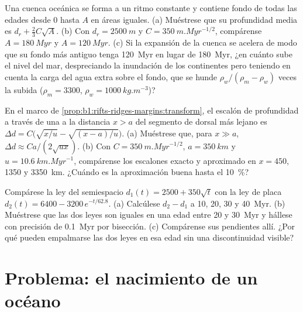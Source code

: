 \begin{exercise}[$\star\star\star$]\label{exo:b1:rifts-ridges-margins:10}
Una cuenca oceánica se forma a un ritmo constante y contiene fondo de todas las edades desde 0 hasta $A$ en áreas iguales. (a) Muéstrese
que su profundidad media es $d_r +
\frac23C\sqrt A$. (b) Con $d_r = \qty{2500}{m}$ y
$C = \qty{350}{m.Myr^{-1/2}}$, compárense $A = \qty{180}{Myr}$ y
$A = \qty{120}{Myr}$. (c) Si la expansión de la cuenca se acelera de modo que su fondo más antiguo tenga \qty{120}{Myr} en lugar de
\qty{180}{Myr}, ¿en cuánto sube el nivel del mar, despreciando la inundación de los continentes pero teniendo en cuenta la carga del agua
extra sobre el fondo, que se hunde $\rho_w/(\rho_m - \rho_w)$ veces la subida ($\rho_m = 3300$, $\rho_w = \qty{1000}{kg.m^{-3}}$)?
\end{exercise}

\begin{exercise}[$\star\star\star$]\label{exo:b1:rifts-ridges-margins:11}
En el marco de \cref{prop:b1:rifts-ridges-margins:transform}, el escalón de profundidad a través de una  a la distancia $x > a$
del segmento de dorsal más lejano es $\Delta d = C\bigl(\sqrt{x/u} - \sqrt{(x - a)/u}\bigr)$. (a) Muéstrese que, para
$x \gg a$, $\Delta d \approx Ca/(2\sqrt{ux})$. (b) Con
$C = \qty{350}{m.Myr^{-1/2}}$, $a = \qty{350}{km}$ y
$u = \qty{10.6}{km.Myr^{-1}}$, compárense los escalones exacto y aproximado en
$x = 450$, 1350 y \qty{3350}{km}. ¿Cuándo es la aproximación buena hasta el
\qty{10}{\percent}?
\end{exercise}

\begin{exercise}[$\star\star\star$]\label{exo:b1:rifts-ridges-margins:12}
Compárese la ley del semiespacio $d_1(t) = 2500 + 350\sqrt t$ con la ley de placa $d_2(t) = 6400 - 3200\,e^{-t/62.8}$. (a) Calcúlese $d_2 - d_1$
a 10, 20, 30 y \qty{40}{Myr}. (b) Muéstrese que las dos leyes son iguales en una edad entre 20 y \qty{30}{Myr} y hállese con precisión de
\qty{0.1}{Myr} por bisección. (c) Compárense sus pendientes allí. ¿Por qué pueden empalmarse las dos leyes en esa edad sin una
discontinuidad visible?
\end{exercise}

\section{Problema: el nacimiento de un océano}

